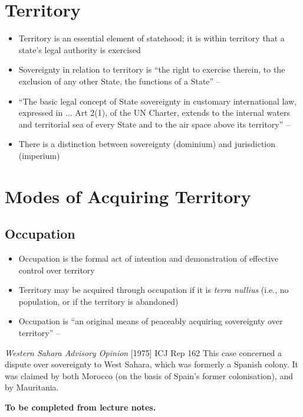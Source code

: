 \section{Territory}
\begin{itemize}
    \item Territory is an essential element of statehood; it is within territory that a state's legal authority is exercised
    \item Sovereignty in relation to territory is ``the right to exercise therein, to the exclusion of any other State, the functions of a State'' -- 
    \item ``The basic legal concept of State sovereignty in customary international law, expressed in ... Art 2(1), of the UN Charter, extends to the internal waters and territorial sea of every State and to the air space above its territory'' -- 
    \item There is a distinction between sovereignty (dominium) and jurisdiction (imperium)
\end{itemize}

\section{Modes of Acquiring Territory}
\subsection{Occupation}
\begin{itemize}
    \item Occupation is the formal act of intention and demonstration of effective control over territory
    \item Territory may be acquired through occupation if it is \textit{terra nullius} (i.e., no population, or if the territory is abandoned)
    \item Occupation is ``an original means of peaceably acquiring sovereignty over territory'' -- 
\end{itemize}

\begin{casedetails}{\textit{Western Sahara Advisory Opinion} [1975] ICJ Rep 162}
    \flushleft
    This case concerned a dispute over sovereignty to West Sahara, which was formerly a Spanish colony. It was claimed by both Morocco (on the basis of Spain's former colonisation), and by Mauritania. 

    \vspace{\baselineskip}

    \textbf{To be completed from lecture notes.}
\end{casedetails}

